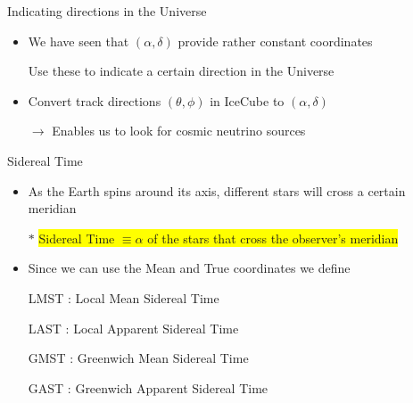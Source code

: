 \Tr
\onecolumn
%
\begin{center}
{\red Indicating directions in the Universe}
\end{center}
%
\begin{itemize}
\item We have seen that $(\alpha,\delta)$ provide rather constant coordinates
\item[] Use these to indicate a certain direction in the Universe
\item Convert track directions $(\theta,\phi)$ in IceCube to $(\alpha,\delta)$
\item[] $\rightarrow$ Enables us to look for cosmic neutrino sources
\end{itemize}
%
\begin{center}
{\red Sidereal Time}
\end{center}
%
\begin{itemize}
\item As the Earth spins around its axis, different stars will cross a certain meridian
\item[$\ast$] \colorbox{yellow}{Sidereal Time $\equiv \alpha$ of the stars that cross the observer's meridian}
\item Since we can use the {\blue Mean and True coordinates} we define
\item[] {\red LMST : Local Mean Sidereal Time}
\item[] {\red LAST : Local Apparent Sidereal Time}
\item[] {\red GMST : Greenwich Mean Sidereal Time}
\item[] {\red GAST : Greenwich Apparent Sidereal Time}
\end{itemize}
